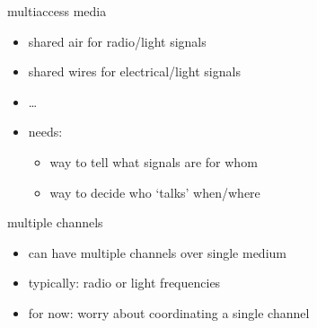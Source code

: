 \begin{frame}{multiaccess media}
    \begin{itemize}
    \item shared air for radio/light signals
    \item shared wires for electrical/light signals
    \item \ldots
    \vspace{.5cm}
    \item needs:
        \begin{itemize}
        \item way to tell what signals are for whom
        \item way to decide who `talks' when/where
        \end{itemize}
    \end{itemize}
\end{frame}

\begin{frame}{multiple channels}
    \begin{itemize}
    \item can have multiple channels over single medium
    \item typically: radio or light frequencies
    \vspace{.5cm}
    \item<2-> for now: worry about coordinating a single channel
    \end{itemize}
\end{frame}

